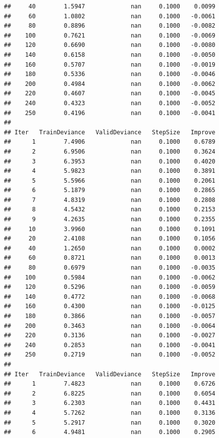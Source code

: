 \documentclass[]{book}
\begin{document}
\begin{verbatim}
##     40        1.5947             nan     0.1000    0.0099
##     60        1.0802             nan     0.1000   -0.0061
##     80        0.8896             nan     0.1000   -0.0082
##    100        0.7621             nan     0.1000   -0.0069
##    120        0.6690             nan     0.1000   -0.0080
##    140        0.6158             nan     0.1000   -0.0050
##    160        0.5707             nan     0.1000   -0.0019
##    180        0.5336             nan     0.1000   -0.0046
##    200        0.4984             nan     0.1000   -0.0062
##    220        0.4607             nan     0.1000   -0.0045
##    240        0.4323             nan     0.1000   -0.0052
##    250        0.4196             nan     0.1000   -0.0041
## 
## Iter   TrainDeviance   ValidDeviance   StepSize   Improve
##      1        7.4906             nan     0.1000    0.6789
##      2        6.9506             nan     0.1000    0.3624
##      3        6.3953             nan     0.1000    0.4020
##      4        5.9823             nan     0.1000    0.3891
##      5        5.5966             nan     0.1000    0.2061
##      6        5.1879             nan     0.1000    0.2865
##      7        4.8319             nan     0.1000    0.2808
##      8        4.5432             nan     0.1000    0.2153
##      9        4.2635             nan     0.1000    0.2355
##     10        3.9960             nan     0.1000    0.1091
##     20        2.4108             nan     0.1000    0.1056
##     40        1.2650             nan     0.1000    0.0002
##     60        0.8721             nan     0.1000    0.0013
##     80        0.6979             nan     0.1000   -0.0035
##    100        0.5984             nan     0.1000   -0.0062
##    120        0.5296             nan     0.1000   -0.0059
##    140        0.4772             nan     0.1000   -0.0068
##    160        0.4300             nan     0.1000   -0.0125
##    180        0.3866             nan     0.1000   -0.0057
##    200        0.3463             nan     0.1000   -0.0064
##    220        0.3136             nan     0.1000   -0.0027
##    240        0.2853             nan     0.1000   -0.0041
##    250        0.2719             nan     0.1000   -0.0052
## 
## Iter   TrainDeviance   ValidDeviance   StepSize   Improve
##      1        7.4823             nan     0.1000    0.6726
##      2        6.8225             nan     0.1000    0.6054
##      3        6.2303             nan     0.1000    0.4431
##      4        5.7262             nan     0.1000    0.3136
##      5        5.2917             nan     0.1000    0.3020
##      6        4.9481             nan     0.1000    0.2905

\end{verbatim}
\end{document}
